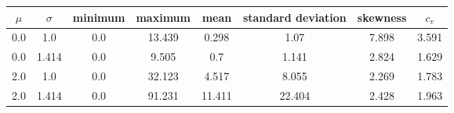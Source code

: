 \begin{tabular}{cccccccc}
  \toprule
  \textbf{\(\mu\)} & \textbf{\(\sigma\)} & \textbf{minimum} & \textbf{maximum} & \textbf{mean} & \textbf{standard deviation} & \textbf{skewness} & \textbf{\(c_v\)} \\\midrule
  0.0 & 1.0 & 0.0 & 13.439 & 0.298 & 1.07 & 7.898 & 3.591 \\
  0.0 & 1.414 & 0.0 & 9.505 & 0.7 & 1.141 & 2.824 & 1.629 \\
  2.0 & 1.0 & 0.0 & 32.123 & 4.517 & 8.055 & 2.269 & 1.783 \\
  2.0 & 1.414 & 0.0 & 91.231 & 11.411 & 22.404 & 2.428 & 1.963 \\\bottomrule
\end{tabular}
